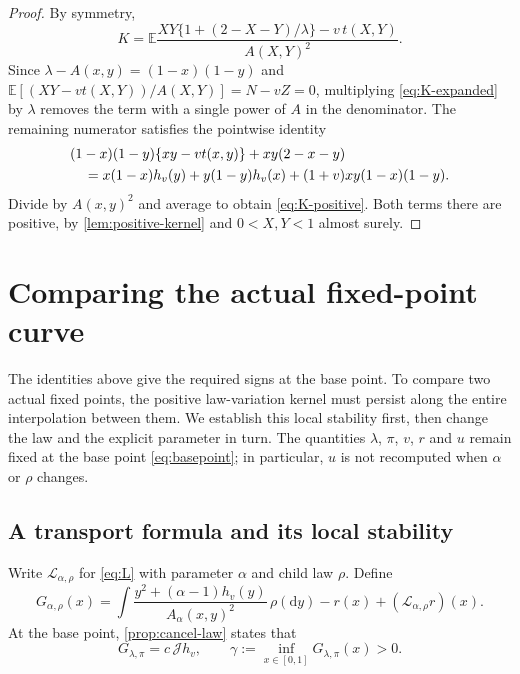 \documentclass[11pt,a4paper]{article}
\numberwithin{equation}{section}
\theoremstyle{notethm}
\theoremstyle{definition}
\newcommand{\E}{\mathbb E}
\newcommand{\cJ}{\mathcal J}
\newcommand{\cL}{\mathcal L}
\begin{document}
\begin{proof}
By symmetry,
\begin{equation}\label{eq:K-expanded}
 K=\E\frac{XY\{1+(2-X-Y)/\lambda\}-v\,t(X,Y)}{A(X,Y)^2}.
\end{equation}
Since $\lambda-A(x,y)=(1-x)(1-y)$ and
$\E[(XY-vt(X,Y))/A(X,Y)]=N-vZ=0$, multiplying
\eqref{eq:K-expanded} by $\lambda$ removes the term with a single power
of $A$ in the denominator. The remaining numerator satisfies the pointwise
identity
\begin{align}
 &(1-x)(1-y)\{xy-vt(x,y)\}+xy(2-x-y)\notag\\
 &\quad=x(1-x)h_v(y)+y(1-y)h_v(x)
             +(1+v)xy(1-x)(1-y).\label{eq:pointwise-K}
\end{align}
Divide by $A(x,y)^2$ and average to obtain \eqref{eq:K-positive}.
Both terms there are positive, by \cref{lem:positive-kernel} and
$0<X,Y<1$ almost surely.
\end{proof}

\section{Comparing the actual fixed-point curve}\label{sec:comparison}

The identities above give the required signs at the base point. To compare
two actual fixed points, the positive law-variation kernel must persist
along the entire interpolation between them. We establish this local
stability first, then change the law and the explicit parameter in turn.
The quantities $\lambda$, $\pi$, $v$, $r$ and $u$ remain fixed at the
base point \eqref{eq:basepoint}; in particular, $u$ is not recomputed
when $\alpha$ or $\rho$ changes.

\subsection{A transport formula and its local stability}

Write $\cL_{\alpha,\rho}$ for \eqref{eq:L} with parameter $\alpha$ and
child law $\rho$. Define
\begin{equation}\label{eq:G-field}
 G_{\alpha,\rho}(x)
 =\int\frac{y^2+(\alpha-1)h_v(y)}{A_\alpha(x,y)^2}\,\rho(\mathrm dy)
   -r(x)+(\cL_{\alpha,\rho}r)(x).
\end{equation}
At the base point, \cref{prop:cancel-law} states that
\begin{equation}\label{eq:G-base}
 G_{\lambda,\pi}=c\,\cJ h_v,
 \qquad \gamma:=\inf_{x\in[0,1]}G_{\lambda,\pi}(x)>0.
\end{equation}
\end{document}
